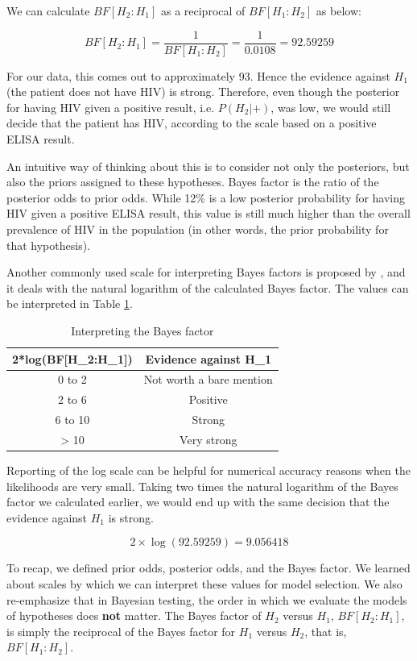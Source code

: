 \documentclass[]{book}
\theoremstyle{definition}
\theoremstyle{definition}
\theoremstyle{definition}
\theoremstyle{remark}
\begin{document}
We can calculate \(BF[H_2:H_1]\) as a reciprocal of \(BF[H_1:H_2]\) as
below:

\[BF[H_2:H_1] = \frac{1}{BF[H_1:H_2]} = \frac{1}{0.0108} = 92.59259\]

For our data, this comes out to approximately 93. Hence the evidence
against \(H_1\) (the patient does not have HIV) is strong. Therefore,
even though the posterior for having HIV given a positive result, i.e.
\(P(H_2|+)\), was low, we would still decide that the patient has HIV,
according to the scale based on a positive ELISA result.

An intuitive way of thinking about this is to consider not only the
posteriors, but also the priors assigned to these hypotheses. Bayes
factor is the ratio of the posterior odds to prior odds. While 12\% is a
low posterior probability for having HIV given a positive ELISA result,
this value is still much higher than the overall prevalence of HIV in
the population (in other words, the prior probability for that
hypothesis).

Another commonly used scale for interpreting Bayes factors is proposed
by \citet{kass1995bayes}, and it deals with the natural logarithm of the
calculated Bayes factor. The values can be interpreted in Table
\ref{tab:kass1995}.

\begin{table}

\caption{\label{tab:kass1995}Interpreting the Bayes factor}
\centering
\begin{tabular}[t]{cc}
\toprule
2*log(BF[H\_2:H\_1]) & Evidence against H\_1\\
\midrule
0 to 2 & Not worth a bare mention\\
2 to 6 & Positive\\
6 to 10 & Strong\\
> 10 & Very strong\\
\bottomrule
\end{tabular}
\end{table}

Reporting of the log scale can be helpful for numerical accuracy reasons
when the likelihoods are very small. Taking two times the natural
logarithm of the Bayes factor we calculated earlier, we would end up
with the same decision that the evidence against \(H_1\) is strong.

\[2 \times \log(92.59259) = 9.056418\]

To recap, we defined prior odds, posterior odds, and the Bayes factor.
We learned about scales by which we can interpret these values for model
selection. We also re-emphasize that in Bayesian testing, the order in
which we evaluate the models of hypotheses does \textbf{not} matter. The
Bayes factor of \(H_2\) versus \(H_1\), \(BF[H_2:H_1]\), is simply the
reciprocal of the Bayes factor for \(H_1\) versus \(H_2\), that is,
\(BF[H_1:H_2]\).
\end{document}
